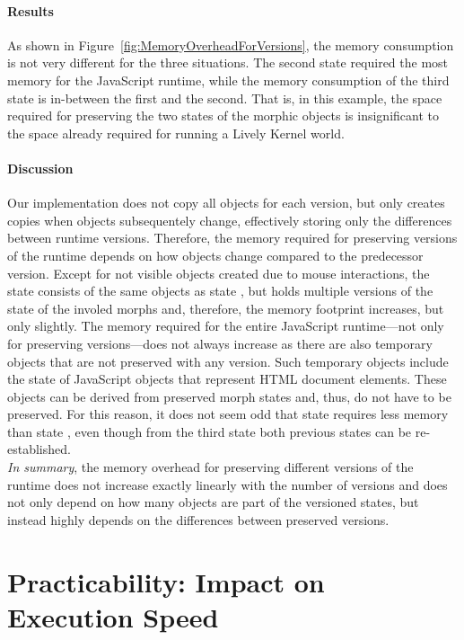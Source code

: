 \paragraph{Results}
As shown in Figure~\ref{fig:MemoryOverheadForVersions}, the memory consumption is not very different for the three situations.
The second state required the most memory for the JavaScript runtime, while the memory consumption of the third state is in-between the first and the second.
That is, in this example, the space required for preserving the two states of the morphic objects is insignificant to the space already required for running a Lively Kernel world.

\paragraph{Discussion}
Our implementation does not copy all objects for each version, but only creates copies when objects subsequentely change, effectively storing only the differences between runtime versions.
Therefore, the memory required for preserving versions of the runtime depends on how objects change compared to the predecessor version.
Except for not visible objects created due to mouse interactions, the state  consists of the same objects as state , but holds multiple versions of the state of the involed morphs and, therefore, the memory footprint increases, but only slightly.
The memory required for the entire JavaScript runtime---not only for preserving versions---does not always increase as there are also temporary objects that are not preserved with any version.
Such temporary objects include the state of JavaScript objects that represent HTML document elements.
These objects can be derived from preserved morph states and, thus, do not have to be preserved.
For this reason, it does not seem odd that state  requires less memory than state , even though from the third state both previous states can be re-established.\\
\emph{In summary}, the memory overhead for preserving different versions of the runtime does not increase exactly linearly with the number of versions and does not only depend on how many objects are part of the versioned states, but instead highly depends on the differences between preserved versions.



\section{Practicability: Impact on Execution Speed} \label{sec:EVALUATION:4}

